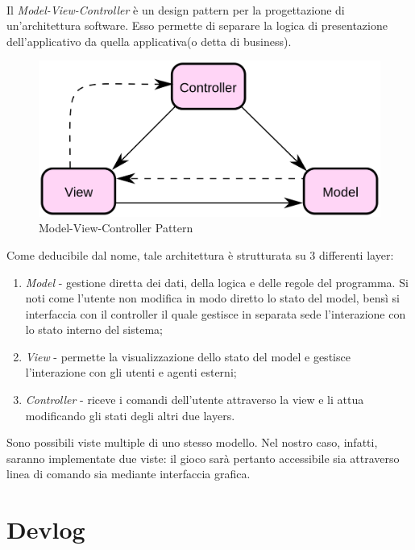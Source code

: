 \documentclass[a4paper, 12pt]{article}
\begin{document}
	\paragraph{}
	Il \emph{Model-View-Controller} è un design pattern per la progettazione di un'architettura software. Esso permette di separare la logica di presentazione dell'applicativo da quella applicativa(o detta di business).\\
	\begin{figure}[h!]
		\centering
		\includegraphics[scale=0.35]{mvc.png}
		\caption{Model-View-Controller Pattern}
	\end{figure}
	
	Come deducibile dal nome, tale architettura è strutturata su 3 differenti layer:\\
	\begin{enumerate}
		\item \emph{Model} - gestione diretta dei dati, della logica e delle regole del programma. Si noti come l'utente non modifica in modo diretto lo stato del model, bensì si interfaccia con il controller il quale gestisce in separata sede l'interazione con lo stato interno del sistema;
		\item \emph{View} - permette la visualizzazione dello stato del model e gestisce l'interazione con gli utenti e agenti esterni; 
		\item \emph{Controller} - riceve i comandi dell'utente attraverso la view e li attua modificando gli stati degli altri due layers.
	\end{enumerate}
	Sono possibili viste multiple di uno stesso modello. Nel nostro caso, infatti, saranno implementate due viste: il gioco sarà pertanto accessibile sia attraverso linea di comando sia mediante interfaccia grafica.
	
	\newpage
	\section{Devlog}
\end{document}
